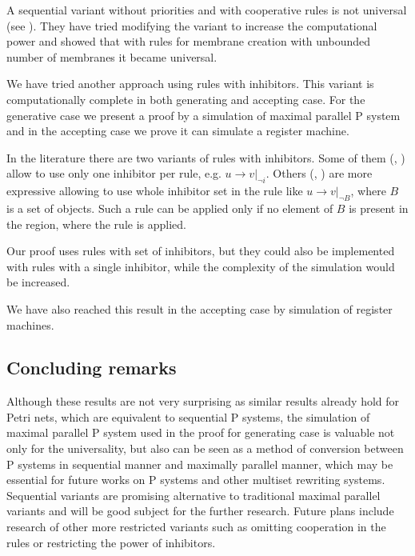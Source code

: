  A sequential variant without priorities and with cooperative rules is not universal (see \cite{Ibarra04dang}). They have tried modifying the variant to increase the computational power and showed that with rules for membrane creation with unbounded number of membranes it became universal.

We have tried another approach using rules with inhibitors. This variant is computationally complete in both generating and accepting case. For the generative case we present a proof by a simulation of maximal parallel P system and in the accepting case we prove it can simulate a register machine.

In the literature there are two variants of  rules with inhibitors.
Some of them (\cite{Ionescu:jucs_10_5:on_p_systems_with}, \cite{Sburlan05dragos}) allow to use only one inhibitor per rule, e.g. $u\rightarrow v|_{\neg i}$.
Others (\cite{Agrigoroaiei:2010:Dissolution}, \cite{Sburlan:2006:FurtherResultsPromotersInhibitors}) are more expressive allowing to use whole inhibitor set in the rule like $u\rightarrow v|_{\neg B}$, where $B$ is a set of objects. Such a rule can be applied only if no element of $B$ is present in the region, where the rule is applied.

Our proof uses rules with set of inhibitors, but they could also be implemented with rules with a single inhibitor, while the complexity of the simulation would be increased. 



We have also reached this result in the accepting case by simulation of  register machines.



\subsection{Concluding remarks} %
\label{sub:concluding_remarks_of_inhibitors}

Although these results are not very surprising as similar results already hold for Petri nets, which are equivalent to sequential P systems, the simulation of maximal parallel P system used in the proof for generating case is valuable not only for the universality, but also can be seen as a method of conversion between P systems in sequential manner and maximally parallel manner, which may be essential for future works on P systems and other multiset rewriting systems. Sequential variants are promising alternative to traditional maximal parallel variants and will be good subject for the further research. Future plans include research of other more restricted variants such as omitting cooperation in the rules or restricting the power of inhibitors.

